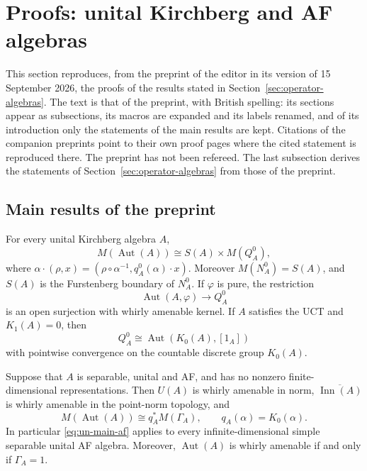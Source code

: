 \section{Proofs: unital Kirchberg and AF algebras}\label{sec:proofs-unital-kirchberg-af}

This section reproduces, from the preprint of the editor \cite{LupiniUnital2026} in its version of 15 September 2026, the
proofs of the results stated in Section~\ref{sec:operator-algebras}. The text is that of the
preprint, with British spelling: its sections appear as subsections, its macros
are expanded and its labels renamed, and of its introduction only the
statements of the main results are kept. Citations of the companion preprints
point to their own proof pages where the cited statement is reproduced there.
The preprint has not been refereed. The last subsection derives the statements
of Section~\ref{sec:operator-algebras} from those of the preprint.

\subsection{Main results of the preprint}\label{sec:un-main-results}

\begin{theorem}\label{thm:un-main-kirchberg}
For every unital Kirchberg algebra \(A\),
\begin{equation}\label{eq:un-main-kirchberg}
 M(\operatorname{Aut}(A))\cong S(A)\times M(Q_A^0),
\end{equation}
where \(\alpha\cdot(\rho,x)=(\rho\circ\alpha^{-1},q_A^0(\alpha)\cdot x)\).
Moreover \(M(N_A^0)=S(A)\), and \(S(A)\) is the Furstenberg boundary
of \(N_A^0\). If \(\varphi\) is pure, the restriction
\[
 \operatorname{Aut}(A,\varphi)\longrightarrow Q_A^0
\]
is an open surjection with whirly amenable kernel. If \(A\) satisfies
the UCT and \(K_1(A)=0\), then
\[
 Q_A^0\cong\operatorname{Aut}(K_0(A),[1_A])
\]
with pointwise convergence on the countable discrete group \(K_0(A)\).
\end{theorem}

\begin{theorem}\label{thm:un-main-af}
Suppose that \(A\) is separable, unital and AF, and has no nonzero
finite-dimensional representations. Then \(U(A)\) is whirly amenable
in norm, \(\overline{\operatorname{Inn}(A)}\) is whirly amenable in the point-norm
topology, and
\begin{equation}\label{eq:un-main-af}
 M(\operatorname{Aut}(A))\cong q_A^*M(\Gamma_A),
 \qquad q_A(\alpha)=K_0(\alpha).
\end{equation}
In particular \eqref{eq:un-main-af} applies to every infinite-dimensional
simple separable unital AF algebra.
Moreover, \(\operatorname{Aut}(A)\) is whirly amenable if and only if \(\Gamma_A=1\).
\end{theorem}

